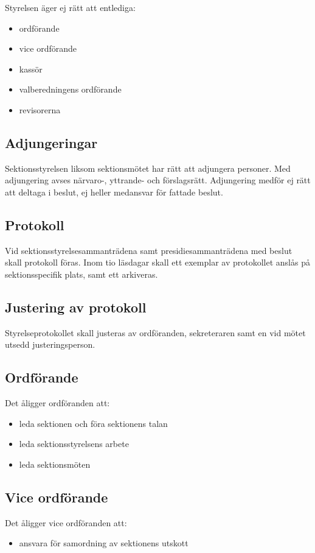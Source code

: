 \documentclass{datateknologsektionen-document}
\begin{document}
Styrelsen äger ej rätt att entlediga:
\begin{itemize}
  \item ordförande
  \item vice ordförande
  \item kassör
  \item valberedningens ordförande
  \item revisorerna
\end{itemize}

\subsection{Adjungeringar}
Sektionsstyrelsen liksom sektionsmötet har rätt att adjungera personer. Med adjungering
avses närvaro-, yttrande- och förslagsrätt. Adjungering medför ej rätt att deltaga i beslut,
ej heller medansvar för fattade beslut.

\subsection{Protokoll}
Vid sektionsstyrelsesammanträdena samt presidiesammanträdena med beslut skall protokoll föras.
Inom tio läsdagar skall ett exemplar av protokollet anslås på sektionsspecifik plats, samt
ett arkiveras.

\subsection{Justering av protokoll}
Styrelseprotokollet skall justeras av ordföranden, sekreteraren samt en vid mötet utsedd
justeringsperson.

\subsection{Ordförande}
Det åligger ordföranden att:
\begin{itemize}
  \item leda sektionen och föra sektionens talan
  \item leda sektionsstyrelsens arbete
  \item leda sektionsmöten
\end{itemize}

\subsection{Vice ordförande}
Det åligger vice ordföranden att:
\begin{itemize}
  \item ansvara för samordning av sektionens utskott
\end{itemize}
\end{document}
